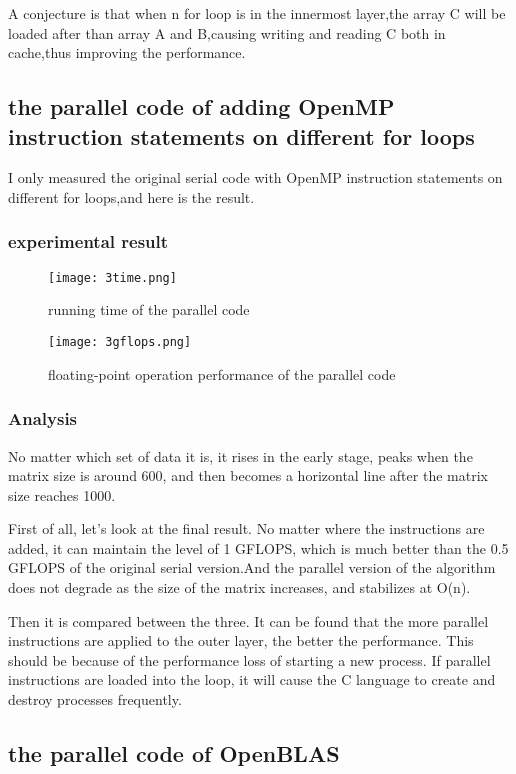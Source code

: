\documentclass[11pt]{scrartcl} %
\begin{document}
		A conjecture is that when n for loop is in the innermost layer,the array C will be loaded after than array A and B,causing writing and reading C both in cache,thus improving the performance.


\subsection{the parallel code of adding OpenMP instruction statements on different for loops}\label{adfa}
	I only measured the original serial code with OpenMP instruction statements on different for loops,and here is the result.
	\subsubsection{experimental result}
		\begin{figure}[H]
			\centering
			\texttt{[image: 3time.png]}
			\caption{running time of the parallel code}
			\label{}
		\end{figure}
		\begin{figure}[H]
			\centering
			\texttt{[image: 3gflops.png]}
			\caption{floating-point operation performance of the parallel code}
			\label{}
		\end{figure}
	\subsubsection{Analysis}
	No matter which set of data it is, it rises in the early stage, peaks when the matrix size is around 600, and then becomes a horizontal line after the matrix size reaches 1000.

First of all, let's look at the final result. No matter where the instructions are added, it can maintain the level of 1 GFLOPS, which is much better than the 0.5 GFLOPS of the original serial version.And the parallel version of the algorithm does not degrade as the size of the matrix increases, and stabilizes at O(n).

Then it is compared between the three. It can be found that the more parallel instructions are applied to the outer layer, the better the performance. This should be because of the performance loss of starting a new process. If parallel instructions are loaded into the loop, it will cause the C language to create and destroy processes frequently.
\subsection{the parallel code of OpenBLAS}
\end{document}
